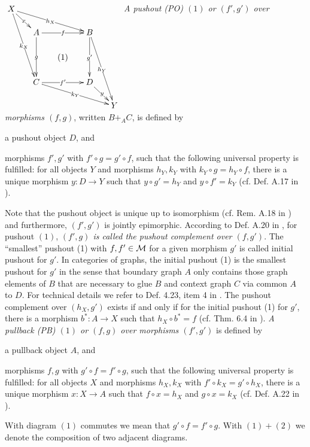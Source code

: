 \begin{remark}
{
$
\xymatrix@C-2ex@R-2ex{
X \ar[rd]|{x} \ar[rrrd]|{h_X} \ar[dddr]|{k_X} & & & & \\
  & A \ar[rr]|{f} \ar[dd]|{g} & & B \ar[dd]|{g'} \ar[rddd]|{h_Y} & \\
  & & (1) & & \\
  & C \ar[rr]|{f'} \ar[rrrd]|{k_Y} & & D \ar[rd]|{y} & \\
  & & & & Y
}
$
}
\emph{A pushout (PO) $(1)$ or $(f',g')$ over morphisms $(f,g)$}, written $B +_A C$, is defined by
\begin{enumerate*}
\item a pushout object $D$, and
\item morphisms $f',g'$ with $f' \circ g=g' \circ f$, such that the following universal property is fulfilled: for all objects $Y$ and morphisms $h_Y,k_Y$ with $k_Y \circ g=h_Y \circ f$, there is a unique morphism $y\colon D \to Y$ such that $y \circ g'=h_Y$ and $y \circ f'=k_Y$ (cf. Def. A.17 in \cite{Ehrig:2006:FAG:1121741}).
\end{enumerate*}
Note that the pushout object is unique up to isomorphism (cf. Rem. A.18 in \cite{Ehrig:2006:FAG:1121741}) and furthermore, $(f',g')$ is jointly epimorphic.
According to Def. A.20 in \cite{Ehrig:2006:FAG:1121741}, for pushout $(1)$, \emph{$(f',g)$ is called the pushout complement over $(f,g')$}.
The ``smallest'' pushout (1) with $f,f' \in {\cal M}$ for a given morphism $g'$ is called initial pushout for $g'$.
In categories of graphs, the initial pushout (1) is the smallest pushout for $g'$ in the sense that boundary graph $A$ only contains those graph elements of $B$ that are necessary to glue $B$ and context graph $C$ via common $A$ to $D$.
For technical details we refer to Def. 4.23, item 4 in \cite{FAGT2}.
The pushout complement over $(h_X,g')$ exists if and only if for the initial pushout (1) for $g'$, there is a morphism $b^*\colon A \to X$ such that $h_X \circ b^*=f$ (cf. Thm. 6.4 in \cite{Ehrig:2006:FAG:1121741}).
\emph{A pullback (PB) $(1)$ or $(f,g)$ over morphisms $(f',g')$} is defined by
\begin{enumerate*}
\item a pullback object $A$, and
\item morphisms $f,g$ with $g' \circ f=f' \circ g$, such that the following universal property is fulfilled: for all objects $X$ and morphisms $h_X,k_X$ with $f' \circ k_X=g' \circ h_X$, there is a unique morphism $x\colon X \to A$ such that $f \circ x=h_X$ and $g \circ x=k_X$ (cf. Def. A.22 in \cite{Ehrig:2006:FAG:1121741}).
\end{enumerate*}
With diagram $(1)$ commutes we mean that $g' \circ f=f' \circ g$.
With $(1)+(2)$ we denote the composition of two adjacent diagrams.
\envEndMarker
\end{remark}

